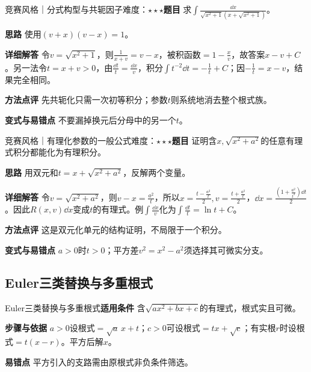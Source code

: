 \begin{example}{竞赛风格｜分式构型与共轭因子}{难度：$\star\star\star$}\label{deep:ex:integral_source_deep:dual2}\textbf{题目} 求$\int\frac{\dd x}{\sqrt{x^2+1}(x+\sqrt{x^2+1})}$。\par\textbf{思路} 使用$(v+x)(v-x)=1$。\par\textbf{详细解答} 令$v=\sqrt{x^2+1}$，则$\frac{1}{x+v}=v-x$，被积函数$=1-\frac{x}{v}$，故答案$x-v+C$。另一法令$t=x+v>0$，由$\frac{\dd t}{t}=\frac{\dd x}{v}$，积分$\int t^{-2}\dd t=-\frac{1}{t}+C$；因$-\frac{1}{t}=x-v$，结果完全相同。\par\textbf{方法点评} 先共轭化只需一次初等积分；参数$t$则系统地消去整个根式族。\par\textbf{变式与易错点} 不要漏掉换元后分母中的另一个$t$。\end{example}

\begin{example}{竞赛风格｜有理化参数的一般公式}{难度：$\star\star\star$}\label{deep:ex:integral_source_deep:dual3}\textbf{题目} 证明含$x,\sqrt{x^2+a^2}$的任意有理式积分都能化为有理积分。\par\textbf{思路} 用双元和$t=x+\sqrt{x^2+a^2}$，反解两个变量。\par\textbf{详细解答} 令$v=\sqrt{x^2+a^2}$，则$v-x=\frac{a^2}{t}$，所以$x=\frac{t-\frac{a^2}{t}}{2},v=\frac{t+\frac{a^2}{t}}{2}$，$\dd x=\frac{(1+\frac{a^2}{t^2})\dd t}{2}$。因此$R(x,v)\dd x$变成$t$的有理式。例$\int\frac{\dd x}{v}$化为$\int\frac{\dd t}{t}=\ln t+C$。\par\textbf{方法点评} 这是双元化单元的结构证明，不局限于一个积分。\par\textbf{变式与易错点} $a>0$时$t>0$；平方差$v^2=x^2-a^2$须选择其可微实分支。\end{example}

\subsection{Euler三类替换与多重根式}\label{deep:integral_source_deep:euler}

\begin{method}{Euler三类替换与多重根式}\textbf{适用条件} 含$\sqrt{ax^2+bx+c}$的有理式，根式实且可微。\par\textbf{步骤与依据} $a>0$设根式$=\sqrt a\,x+t$；$c>0$可设根式$=tx+\sqrt c$；有实根$r$时设根式$=t(x-r)$。平方后解$x$。\par\textbf{易错点} 平方引入的支路需由原根式非负条件筛选。\end{method}

